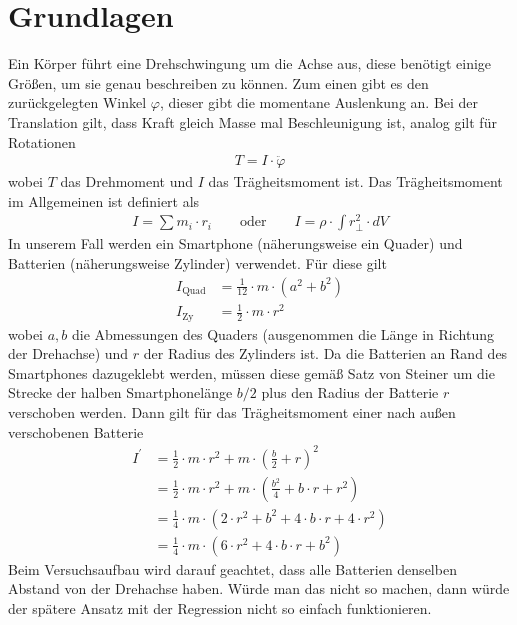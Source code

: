 \documentclass{article}
\begin{document}
\section{Grundlagen}
Ein Körper führt eine Drehschwingung um die Achse aus, diese benötigt einige Größen, um sie genau beschreiben zu können. Zum einen gibt es den zurückgelegten Winkel $\varphi$, dieser gibt die momentane Auslenkung an. Bei der Translation gilt, dass Kraft gleich Masse mal Beschleunigung ist, analog gilt für Rotationen
\begin{align}
T = I \cdot \ddot{\varphi}
\end{align}
wobei $T$ das Drehmoment und $I$ das Trägheitsmoment ist.
Das Trägheitsmoment im Allgemeinen ist definiert als
\begin{align}
I = \sum m_i \cdot r_i \qquad \text{oder} \qquad I = \rho \cdot \int r_{\perp}^2 \cdot dV
\end{align}
In unserem Fall werden ein Smartphone (näherungsweise ein Quader) und Batterien (näherungsweise Zylinder) verwendet. Für diese gilt
\begin{align}
I_{\text{Quad}} &= \frac{1}{12}\cdot m \cdot (a^2 + b^2) \\
I_{\text{Zy}} &= \frac{1}{2} \cdot m \cdot r^2
\end{align}
wobei $a,b$ die Abmessungen des Quaders (ausgenommen die Länge in Richtung der Drehachse) und $r$ der Radius des Zylinders ist. Da die Batterien an Rand des Smartphones dazugeklebt werden, müssen diese gemäß Satz von Steiner um die Strecke der halben Smartphonelänge $b/2$ plus den Radius der Batterie $r$ verschoben werden. Dann gilt für das Trägheitsmoment einer nach außen verschobenen Batterie
\begin{align}
I^\prime &= \frac{1}{2}\cdot m\cdot r^2 + m \cdot \left(\frac{b}{2} + r\right)^2 \\
&= \frac{1}{2}\cdot m \cdot r^2 + m\cdot\left(\frac{b^2}{4} + b\cdot r + r^2\right)  \\
&= \frac{1}{4}\cdot m\cdot \left( 2\cdot r^2 + b^2 + 4\cdot b \cdot r + 4\cdot r^2\right) \\
&= \frac{1}{4} \cdot m \cdot \left( 6\cdot r^2 + 4\cdot b \cdot r + b^2\right)
\end{align}
Beim Versuchsaufbau wird darauf geachtet, dass alle Batterien denselben Abstand von der Drehachse haben. Würde man das nicht so machen, dann würde der spätere Ansatz mit der Regression nicht so einfach funktionieren.


~
\end{document}
